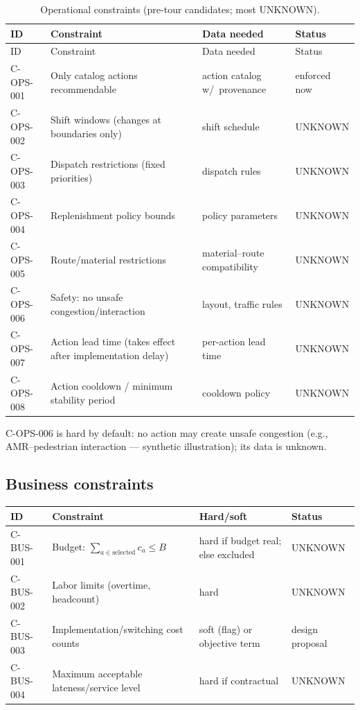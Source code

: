 \documentclass[11pt,a4paper]{article}
\begin{document}
\begin{center}
\small
\begin{longtable}{@{}lp{5.6cm}p{4.0cm}p{2.0cm}@{}}
\caption{Operational constraints (pre-tour candidates; most UNKNOWN).}\\
\toprule
ID & Constraint & Data needed & Status \\
\midrule
\endfirsthead
\toprule
ID & Constraint & Data needed & Status \\
\midrule
\endhead
C-OPS-001 & Only catalog actions recommendable & action catalog w/\
provenance & enforced now \\
C-OPS-002 & Shift windows (changes at boundaries only) & shift schedule &
UNKNOWN \\
C-OPS-003 & Dispatch restrictions (fixed priorities) & dispatch rules &
UNKNOWN \\
C-OPS-004 & Replenishment policy bounds & policy parameters & UNKNOWN \\
C-OPS-005 & Route/material restrictions & material--route compatibility &
UNKNOWN \\
C-OPS-006 & Safety: no unsafe congestion/interaction & layout, traffic
rules & UNKNOWN \\
C-OPS-007 & Action lead time (takes effect after implementation delay) &
per-action lead time & UNKNOWN \\
C-OPS-008 & Action cooldown / minimum stability period & cooldown policy &
UNKNOWN \\
\bottomrule
\end{longtable}
\end{center}

\noindent C-OPS-006 is hard by default: no action may create unsafe
congestion (e.g., AMR--pedestrian interaction --- synthetic illustration);
its data is unknown.

\subsection*{Business constraints}

\begin{center}
\small
\begin{tabular}{@{}lp{7.4cm}p{2.2cm}p{2.0cm}@{}}
\toprule
ID & Constraint & Hard/soft & Status \\
\midrule
C-BUS-001 & Budget: $\sum_{a \in \text{selected}} c_a \le B$ & hard if
budget real; else excluded & UNKNOWN \\
C-BUS-002 & Labor limits (overtime, headcount) & hard & UNKNOWN \\
C-BUS-003 & Implementation/switching cost counts & soft (flag) or objective
term & design proposal \\
C-BUS-004 & Maximum acceptable lateness/service level & hard if contractual
& UNKNOWN \\
\bottomrule
\end{tabular}
\end{center}
\end{document}
